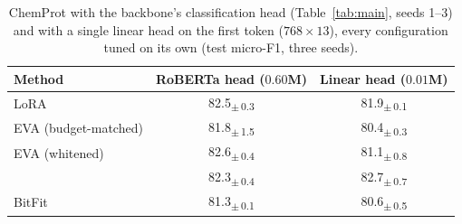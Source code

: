 \begin{table}[h]
\centering
\caption{ChemProt with the backbone's classification head (Table~\ref{tab:main}, seeds 1--3) and with a single linear head on the first token ($768\times13$), every configuration tuned on its own (test micro-F1, three seeds).}
\label{tab:linhead}
\footnotesize
\begin{tabular}{lcc}
\toprule
Method & \shortstack{RoBERTa head\\($0.60$M)} & \shortstack{Linear head\\($0.01$M)} \\
\midrule
LoRA & 82.5\textsubscript{$\pm$\,0.3} & 81.9\textsubscript{$\pm$\,0.1} \\
EVA (budget-matched) & 81.8\textsubscript{$\pm$\,1.5} & 80.4\textsubscript{$\pm$\,0.3} \\
EVA (whitened) & 82.6\textsubscript{$\pm$\,0.4} & 81.1\textsubscript{$\pm$\,0.8} \\
\method{} & 82.3\textsubscript{$\pm$\,0.4} & 82.7\textsubscript{$\pm$\,0.7} \\
BitFit & 81.3\textsubscript{$\pm$\,0.1} & 80.6\textsubscript{$\pm$\,0.5} \\
\bottomrule
\end{tabular}
\end{table}
